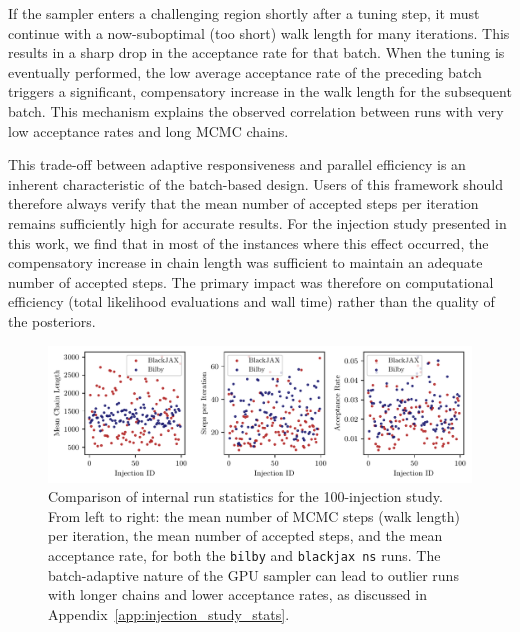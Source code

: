 \documentclass[fleqn,usenatbib]{mnras}
\begin{document}
If the sampler enters a challenging region shortly after a tuning step,
it must continue with a now-suboptimal (too short) walk length for many
iterations. This results in a sharp drop in the acceptance rate for that
batch. When the tuning is eventually performed, the low average
acceptance rate of the preceding batch triggers a significant,
compensatory increase in the walk length for the subsequent batch. This
mechanism explains the observed correlation between runs with very low
acceptance rates and long MCMC chains.

This trade-off between adaptive responsiveness and parallel efficiency
is an inherent characteristic of the batch-based design. Users of this 
framework should therefore always verify that the mean number of
accepted steps per iteration remains sufficiently high for
accurate results. For the injection study presented in this work, we
find that in most of the instances where this effect occurred, the compensatory
increase in chain length was sufficient to maintain an adequate number
of accepted steps. The primary impact was therefore on computational
efficiency (total likelihood evaluations and wall time) rather than the
quality of the posteriors.

\begin{figure}
    \centering
    \includegraphics{figures/performance_metrics.pdf}
    \caption{Comparison of internal run statistics for the 100-injection
    study. From left to right: the mean number of MCMC steps (walk length)
    per iteration, the mean number of accepted steps, and the
    mean acceptance rate, for both the \texttt{bilby} and 
    \texttt{blackjax ns} runs. The batch-adaptive nature of the GPU sampler can
    lead to outlier runs with longer chains and lower acceptance rates,
    as discussed in Appendix~\ref{app:injection_study_stats}.}
    \label{fig:injection_study_stats}
\end{figure}
\end{document}
